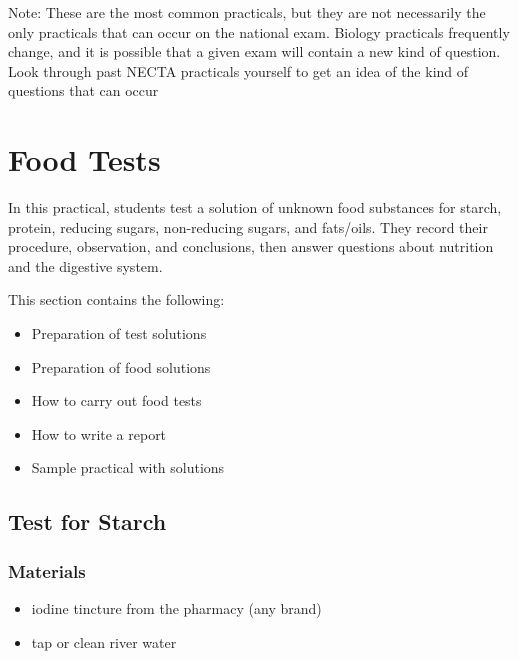 Note: These are the most common practicals, but they are not necessarily the only practicals that can occur on the national exam. Biology practicals frequently change, and it is possible that a given exam will contain a new kind of question. Look through past NECTA practicals yourself to get an idea of the kind of questions that can occur

\section{Food Tests}

In this practical, students test a solution of unknown food substances for starch, protein, reducing sugars, non-reducing sugars, and fats/oils. They record their procedure, observation, and conclusions, then answer questions about nutrition and the digestive system.

This section contains the following:
\begin{itemize}
\item{Preparation of test solutions}
\item{Preparation of food solutions}
\item{How to carry out food tests}
\item{How to write a report}
\item{Sample practical with solutions}
\end{itemize}

\subsection{Test for Starch}

\subsubsection{Materials}
\begin{itemize}
\item{iodine tincture from the pharmacy (any brand)}
\item{tap or clean river water}
\end{itemize}

